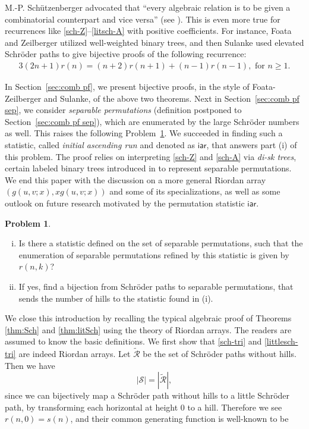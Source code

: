 \documentclass[11pt,reqno]{amsart}
\numberwithin{equation}{section}
\theoremstyle{plain}
\theoremstyle{definition}
\newtheorem{?}[theorem]{Problem}
\newcommand{\R}{\mathcal{R}}
\newcommand{\s}{\mathcal{S}}
\def\iar{\mathsf{iar}}
\begin{document}
M.-P. Sch\"utzenberger advocated that ``every algebraic relation is to be
given a combinatorial counterpart and vice versa'' (see \cite{FZ}). This is even more true for recurrences like \eqref{sch-Z}--\eqref{litsch-A} with positive coefficients. For instance, Foata and Zeilberger \cite{FZ} utilized well-weighted binary trees, and then Sulanke \cite{Sul} used elevated Schr\"oder paths to give bijective proofs of the following recurrence:
\begin{align*}
3(2n+1)r(n)=(n+2)r(n+1)+(n-1)r(n-1), \text{ for $n\ge 1$.}
\end{align*}

In Section~\ref{sec:comb pf}, we present bijective proofs, in the style of Foata-Zeilberger and Sulanke, of the above two theorems. Next in Section~\ref{sec:comb pf sep}, we consider \emph{separable permutations} (definition postponed to Section~\ref{sec:comb pf sep}), which are enumerated by the large Schr\"oder numbers as well. This raises the following Problem~\ref{find stat}. We succeeded in finding such a statistic, called \emph{initial ascending run} and denoted as $\iar$, that answers part (i) of this problem. The proof relies on interpreting \eqref{sch-Z} and \eqref{sch-A} via \emph{di-sk trees}, certain labeled binary trees introduced in \cite{FLZ} to represent separable permutations. We end this paper with the discussion on a more general Riordan array $(g(u,v;x),xg(u,v;x))$ and some of its specializations, as well as some outlook on future research motivated by the permutation statistic $\iar$.

\begin{?}\label{find stat}
\begin{enumerate}[(i)]
\item Is there a statistic defined on the set of separable permutations, such that the enumeration of separable permutations refined by this statistic is given by $r(n,k)$?
\item If yes, find a bijection from Schr\"oder paths to separable permutations, that sends the number of hills to the statistic found in (i).
\end{enumerate}
\end{?}

We close this introduction by recalling the typical algebraic proof of Theorems \ref{thm:Sch} and \ref{thm:litSch} using the theory of Riordan arrays. The readers are assumed to know the basic definitions. We first show that \eqref{sch-tri} and \eqref{littlesch-tri} are indeed Riordan arrays. Let $\widetilde{\R}$ be the set of Schr\"oder paths without hills. Then we have
$$|\s|=|\widetilde{\R}|,$$
since we can bijectively map a Schr\"oder path without hills to a little Schr\"oder path, by transforming each horizontal at height $0$ to a hill. Therefore we see $r(n,0)=s(n)$, and their common generating function is well-known to be
\end{document}
